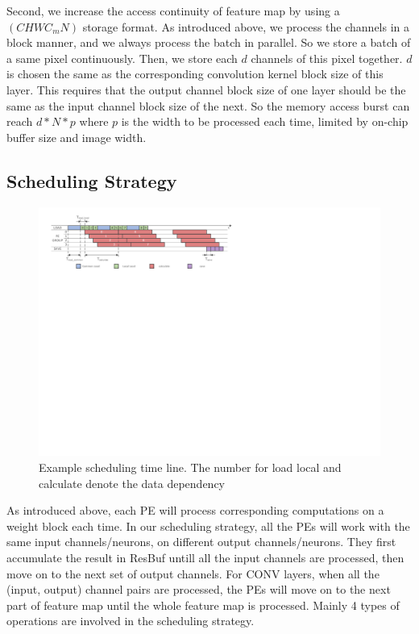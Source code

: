 Second, we increase the access continuity of feature map by using a $(CHWC_mN)$ storage format. As introduced above, we process the channels in a block manner, and we always process the batch in parallel. So we store a batch of a same pixel continuously. Then, we store each $d$ channels of this pixel together. $d$ is chosen the same as the corresponding convolution kernel block size of this layer. This requires that the output channel block size of one layer should be the same as the input channel block size of the next. So the memory access burst can reach $d*N*p$ where $p$ is the width to be processed each time, limited by on-chip buffer size and image width. 



\subsection{Scheduling Strategy}

\begin{figure}[t]
  \centering
  \includegraphics[width=1.8\columnwidth]{figures/schedule.pdf}
  \caption{Example scheduling time line. The number for load local and calculate denote the data dependency}
  \label{fig:sch}
\end{figure}

As introduced above, each PE will process corresponding computations on a weight block each time. In our scheduling strategy, all the PEs will work with the same input channels/neurons, on different output channels/neurons. They first accumulate the result in ResBuf untill all the input channels are processed, then move on to the next set of output channels. For CONV layers, when all the (input, output) channel pairs are processed, the PEs will move on to the next part of feature map until the whole feature map is processed. Mainly 4 types of operations are involved in the scheduling strategy.


